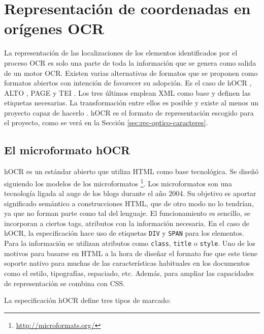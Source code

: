 
\section{Representación de coordenadas en orígenes OCR}

La representación de las localizaciones de los elementos identificados por el proceso OCR es solo una parte de toda la información que se genera como salida de un motor OCR. Existen varias alternativas de formatos que se proponen como formatos abiertos con intención de favorecer su adopción. Es el caso de hOCR \cite{ocrRepres_hocr_breuel_spec}, ALTO \cite{ocrRepres_alto_spec}, PAGE \cite{ocrRepres_page_pletschacher_paper} y TEI \cite{ocrRepres_tei_project}. Los tres últimos emplean XML como base y definen las etiquetas necesarias. La transformación entre ellos es posible y existe al menos un proyecto capaz de hacerlo
\cite{ocrRepres_conversion_ocrFileformat}. hOCR es el formato de representación escogido para el proyecto, como se verá en la Sección \ref{sec:rec-optico-caracteres}.

\subsection{El microformato hOCR}

hOCR es un estándar abierto que utiliza HTML como base tecnológica. Se diseñó siguiendo los modelos de los microformatos \footnote{\url{http://microformats.org/}}. Los microformatos son una tecnología ligada al auge de los blogs durante el año 2004. Su objetivo es aportar significado semántico a construcciones HTML, que de otro modo no lo tendrían, ya que no forman parte como tal del lenguaje. El funcionamiento es sencillo, se incorporan a ciertos tags, atributos con la información necesaria. En el caso de hOCR, la especificación hace uso de etiquetas \verb|DIV| y \verb|SPAN| para los elementos. Para la información se utilizan atributos como \verb|class|, \verb|title| o \verb|style|. Uno de los motivos para basarse en HTML a la hora de diseñar el formato fue que este tiene soporte nativo para muchas de las características habituales en los documentos como el estilo, tipografías, espaciado, etc. Además, para ampliar las capacidades de representación se combina con CSS.

La especificación hOCR define tres tipos de marcado:

